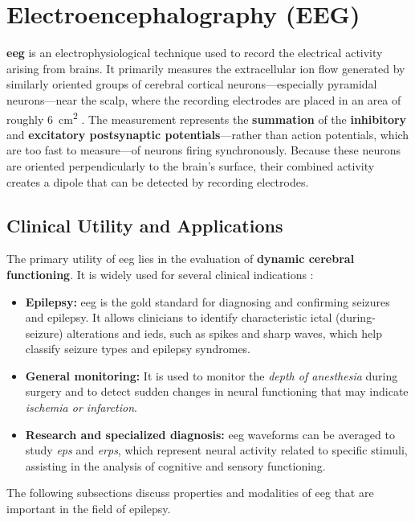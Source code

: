 \section{Electroencephalography (EEG)}
\textbf{\Gls{eeg}} is an electrophysiological technique used to record the electrical activity arising from brains.
It primarily measures the extracellular ion flow generated by similarly oriented groups of cerebral cortical neurons---especially pyramidal neurons---near the scalp, where the recording electrodes are placed in an area of roughly \SI{6}{\cm\squared} \parencite{st_louis_electroencephalography_2016}.
The measurement represents the \textbf{summation} of the \textbf{inhibitory} and \textbf{excitatory postsynaptic potentials}---rather than action potentials, which are too fast to measure---of neurons firing synchronously.
Because these neurons are oriented perpendicularly to the brain's surface, their combined activity creates a dipole that can be detected by recording electrodes.


\subsection{Clinical Utility and Applications}
The primary utility of \gls{eeg} lies in the evaluation of \textbf{dynamic cerebral functioning}. 
It is widely used for several clinical indications \parencite{st_louis_electroencephalography_2016}:
\begin{itemize}
    \item \textbf{Epilepsy:} \gls{eeg} is the gold standard for diagnosing and confirming seizures and epilepsy. 
    It allows clinicians to identify characteristic ictal (during-seizure) alterations and \glspl{ied}, such as spikes and sharp waves, which help classify seizure types and epilepsy syndromes.
    \item \textbf{General monitoring:} It is used to monitor the \textit{depth of anesthesia} during surgery and to detect sudden changes in neural functioning that may indicate \textit{ischemia or infarction}.
    \item \textbf{Research and specialized diagnosis:} \gls{eeg} waveforms can be averaged to study \textit{\glspl{ep}} and \textit{\glspl{erp}}, which represent neural activity related to specific stimuli, assisting in the analysis of cognitive and sensory functioning.
\end{itemize}

The following subsections discuss properties and modalities of \gls{eeg} that are important in the field of epilepsy.


